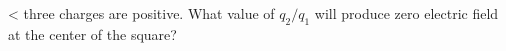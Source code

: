 <%
three charges are positive. What value of $q_2/q_1$ will
produce zero electric field at the center of the square?
